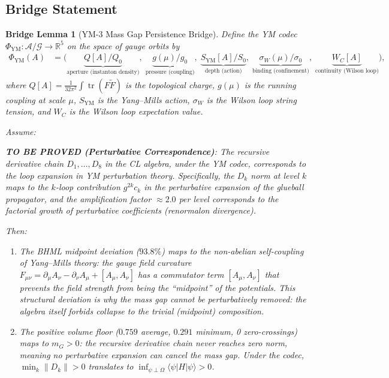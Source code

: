 \documentclass[11pt]{article}
\newtheorem{lemma}{Bridge Lemma}
\theoremstyle{definition}
\DeclareMathOperator{\tr}{tr}
\begin{document}
\subsection{Bridge Statement}

\begin{lemma}[YM-3 Mass Gap Persistence Bridge]
\label{lem:bridge-YM3}
Define the YM codec $\Phi_{\mathrm{YM}}: \mathcal{A}/\mathcal{G} \to \mathbb{R}^5$
on the space of gauge orbits by
\begin{align*}
  \Phi_{\mathrm{YM}}(A) &= \bigl(
    \underbrace{Q[A]/Q_0}_{\text{aperture (instanton density)}},\;
    \underbrace{g(\mu)/g_0}_{\text{pressure (coupling)}},\;
    \underbrace{S_{\mathrm{YM}}[A]/S_0}_{\text{depth (action)}},\;
    \underbrace{\sigma_W(\mu)/\sigma_0}_{\text{binding (confinement)}},\;
    \underbrace{W_C[A]}_{\text{continuity (Wilson loop)}}
  \bigr),
\end{align*}
where $Q[A] = \frac{1}{32\pi^2}\int\tr(F\tilde{F})$ is the topological charge,
$g(\mu)$ is the running coupling at scale $\mu$, $S_{\mathrm{YM}}$ is the
Yang--Mills action, $\sigma_W$ is the Wilson loop string tension, and
$W_C$ is the Wilson loop expectation value.

Assume:

\medskip
\noindent\textbf{TO BE PROVED (Perturbative Correspondence)}:
\emph{The recursive derivative chain $D_1, \ldots, D_8$ in the CL algebra,
under the YM codec, corresponds to the loop expansion in YM perturbation theory.
Specifically, the $D_k$ norm at level $k$ maps to the $k$-loop contribution
$g^{2k} c_k$ in the perturbative expansion of the glueball propagator, and the
amplification factor $\approx 2.0$ per level corresponds to the factorial growth
of perturbative coefficients (renormalon divergence).}

Then:
\begin{enumerate}
  \item[\textbf{(i)}] The BHML midpoint deviation ($93.8\%$) maps to the
    non-abelian self-coupling of Yang--Mills theory:
    the gauge field curvature $F_{\mu\nu} = \partial_\mu A_\nu - \partial_\nu A_\mu + [A_\mu, A_\nu]$
    has a commutator term $[A_\mu, A_\nu]$ that prevents the field strength
    from being the ``midpoint'' of the potentials.
    This structural deviation is why the mass gap cannot be perturbatively removed:
    the algebra itself forbids collapse to the trivial (midpoint) composition.

  \item[\textbf{(ii)}] The positive volume floor ($0.759$ average, $0.291$ minimum,
    0 zero-crossings) maps to $m_G > 0$:
    the recursive derivative chain never reaches zero norm, meaning no
    perturbative expansion can cancel the mass gap.
    Under the codec, $\min_k \|D_k\| > 0$ translates to
    $\inf_{\psi \perp \Omega}\langle\psi|H|\psi\rangle > 0$.


\end{enumerate}
\end{lemma}
\end{document}
